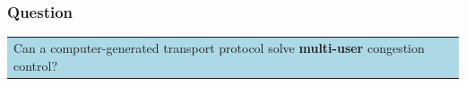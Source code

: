 \documentclass[svgnames]{beamer}
\begin{document}

\begin{frame}
\frametitle{Question}

\begin{centering}
\colorbox{LightBlue}{
\begin{tabular}{p{4.2 in}}
\LARGE Can a computer-generated transport \mbox{protocol}
solve \textbf{multi-user} congestion control?
\end{tabular}}

\end{centering}

\end{frame}
\end{document}
